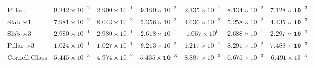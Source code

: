 \begin{table}[t]
{\begin{tabular}{lcccccc}
Pillars
& $9.242\times10^{-2}$
& $2.900\times10^{-1}$
& $9.190\times10^{-2}$
& $2.335\times10^{-1}$
& $8.134\times10^{-2}$
& $\mathbf{7.128\times10^{-2}}$ \\

Slab-$\times1$
& $7.981\times10^{-2}$
& $8.043\times10^{-2}$
& $5.356\times10^{-2}$
& $4.636\times10^{-2}$
& $5.258\times10^{-2}$
& $\mathbf{4.435\times10^{-2}}$ \\

Slab-$\times3$
& $2.980\times10^{-1}$
& $2.980\times10^{-1}$
& $2.618\times10^{-1}$
& $1.057\times10^{0}$
& $2.688\times10^{-1}$
& $\mathbf{2.297\times10^{-1}}$ \\

Pillar-$\times3$
& $1.024\times10^{-1}$
& $1.027\times10^{-1}$
& $9.213\times10^{-2}$
& $1.217\times10^{-1}$
& $8.291\times10^{-2}$
& $\mathbf{7.488\times10^{-2}}$ \\

Cornell Glass
& $5.445\times10^{-3}$
& $4.974\times10^{-2}$
& $\mathbf{5.435\times10^{-3}}$
& $8.887\times10^{-3}$
& $6.675\times10^{-3}$
& $6.491\times10^{-3}$ \\
\bottomrule
\end{tabular}%
}
\end{table}
